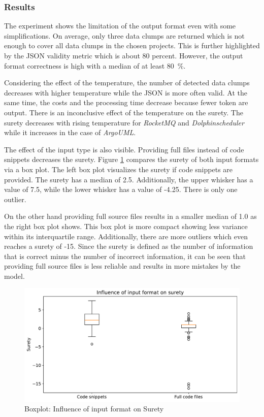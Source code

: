 \subsubsection{Results} 

The experiment shows the limitation of the output format even with some simplifications. On average, only three data clumps are returned which is not enough to cover all data clumps in the chosen projects. This is further highlighted by the \ac{JSON} validity metric which is about 80 percent. However, the output format correctness is high with a median of at least 80~\%. 

Considering the effect of the temperature, the number of detected data clumps decreases with higher temperature while  the \ac{JSON} is more often valid. At the same time, the costs and the processing time decrease because fewer token are output. There is an inconclusive effect of the temperature on the surety. The surety decreases with rising temperature for \textit{RocketMQ} and \textit{Dolphinscheduler} while it increases in the case of \textit{ArgoUML}. 

The effect of the input type is also visible. Providing full files instead of code snippets decreases the surety.  Figure \ref{fig:detect_input_surety} compares the surety of both input formats via a box plot. The left box plot visualizes the surety if code snippets are provided. The surety has a median of 2.5. Additionally, the upper whisker has a value of 7.5, while the lower whisker has a value of -4.25. There is only one outlier.

On the other hand providing full source files results in a smaller median of 1.0 as the right box plot shows. This box plot is more compact showing less variance within its interquartile range.  Additionally, there are more outliers which even reaches a surety of -15.  Since the surety is defined as the number of information that is correct minus the number of incorrect information, it can be seen that providing full source files is less reliable and results in more mistakes by the model. 



\begin{figure}[ht!]
    \centering
    \includegraphics[width=\columnwidth]{figures/chapter5/detect_input_format_surety.pdf}
    \caption{Boxplot: Influence of input format on Surety}
    \label{fig:detect_input_surety}
\end{figure}

